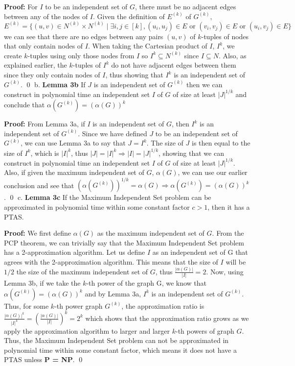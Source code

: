 \documentclass[oneside]{homework} %
\begin{document}
\textbf{Proof:} For $I$ to be an independent set of $G$, there must be no adjacent edges between any of the nodes of $I$. Given the definition of $E^{(k)}$ of $G^{(k)}$, $$E^{(k)} = \{(u, v) \in N^{(k)} \times N^{(k)} \mid \exists i, j \in [k], (u_i, u_j) \in E \text{ or } (v_i, v_j) \in E \text{ or } (u_i, v_j) \in E\}$$ we can see that there are no edges between any pairs $(u, v)$ of $k$-tuples of nodes that only contain nodes of $I$. When taking the Cartesian product of $I$, $I^k$, we create $k$-tuples using only those nodes from $I$ so $I^k \subseteq N^{(k)}$ since $I \subseteq N$. Also, as explained earlier, the $k$-tuples of $I^k$ do not have adjacent edges between them since they only contain nodes of $I$, thus showing that $I^k$ is an independent set of $G^{(k)}$. \hfill\qed
\newline
\newline
{\large b.} \textbf{Lemma 3b} If $J$ is an independent set of $G^{(k)}$ then we can construct in polynomial time an independent set $I$ of $G$ of size at least $|J|^{1/k}$ and conclude that $\alpha(G^{(k)}) = (\alpha(G))^k$
\newline

\textbf{Proof:} From Lemma 3a, if $I$ is an independent set of $G$, then $I^k$ is an independent set of $G^{(k)}$. Since we have defined $J$ to be an independent set of $G^{(k)}$, we can use Lemma 3a to say that $J = I^k$. The size of $J$ is then equal to the size of $I^k$, which is $|I|^k$, thus $|J| = |I|^k \Longrightarrow |I| = |J|^{1/k}$, showing that we can construct in polynomial time an independent set $I$ of $G$ of size at least $|J|^{1/k}$. Also, if given the maximum independent set of $G$, $\alpha(G)$, we can use our earlier conclusion and see that $(\alpha(G^{(k)}))^{1/k} = \alpha(G) \Longrightarrow \alpha(G^{(k)}) = (\alpha(G))^k$. \hfill\qed
\newline
\newline
{\large c.} \textbf{Lemma 3c} If the Maximum Independent Set problem can be approximated in polynomial time within some constant factor $c > 1$, then it has a PTAS.
\newline

\textbf{Proof:} We first define $\alpha(G)$ as the maximum independent set of $G$. From the PCP theorem, we can trivially say that the Maximum Independent Set problem has a 2-approximation algorithm. Let us define $I$ as an independent set of G that agrees with the 2-approximation algorithm. This means that the size of $I$ will be $1/2$ the size of the maximum independent set of $G$, thus $\frac{|\alpha(G)|}{|I|} = 2$. Now, using Lemma 3b, if we take the $k$-th power of the graph G, we know that $\alpha(G^{(k)}) = (\alpha(G))^k$ and by Lemma 3a, $I^k$ is an independent set of $G^{(k)}$. Thus, for some $k$-th power graph $G^{(k)}$, the approximation ratio is $\frac{|\alpha(G)|^k}{|I|^k} = (\frac{|\alpha(G)|}{|I|})^k = 2^k$ which shows that the approximation ratio grows as we apply the approximation algorithm to larger and larger $k$-th powers of graph $G$. Thus, the Maximum Independent Set problem can not be approximated in polynomial time within some constant factor, which means it does not have a PTAS unless \textbf{P = NP}. \hfill\qed
\end{document}
